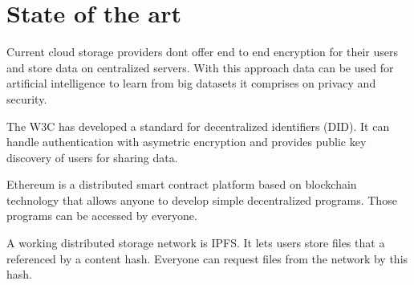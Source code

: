\section{State of the art}

Current cloud storage providers dont offer end to end encryption
for their users and store data on centralized servers. With this
approach data can be used for artificial intelligence to learn
from big datasets it comprises on privacy and security.

The W3C has developed a standard for decentralized identifiers
(DID). It can handle authentication with asymetric encryption
and provides public key discovery of users for sharing data.
\cite{did}

Ethereum is a distributed smart contract platform based on
blockchain technology that allows anyone to develop simple
decentralized programs. Those programs can be accessed by
everyone.
\cite{ethereum}

A working distributed storage network is IPFS. It lets users
store files that a referenced by a content hash. Everyone
can request files from the network by this hash.
\cite{ipfs}